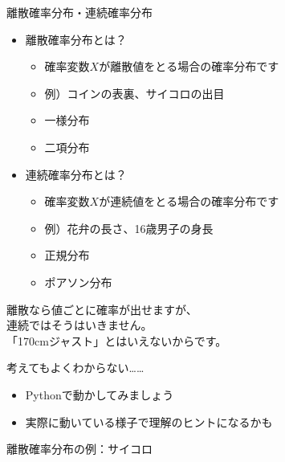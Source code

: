 \documentclass[dvipdfmx,cjk]{beamer}
\begin{document}
\begin{frame}{離散確率分布・連続確率分布}

\begin{itemize}

    \item 離散確率分布とは？
        \begin{itemize}
        \item 確率変数$X$が離散値をとる場合の確率分布です
        \item 例）コインの表裏、サイコロの出目
        \item 一様分布
        \item 二項分布
        \end{itemize}

    \item 連続確率分布とは？
        \begin{itemize}
        \item 確率変数$X$が連続値をとる場合の確率分布です
        \item 例）花弁の長さ、16歳男子の身長
        \item 正規分布
        \item ポアソン分布
        \end{itemize}

\end{itemize}

\vskip 1cm

離散なら値ごとに確率が出せますが、\\
連続ではそうはいきません。\\
「170cmジャスト」とはいえないからです。

\end{frame}


\begin{frame}{考えてもよくわからない……}

\begin{itemize}
    \item Pythonで動かしてみましょう
    \item 実際に動いている様子で理解のヒントになるかも
\end{itemize}

\end{frame}


\begin{frame}{離散確率分布の例：サイコロ}


\end{frame}
\end{document}

